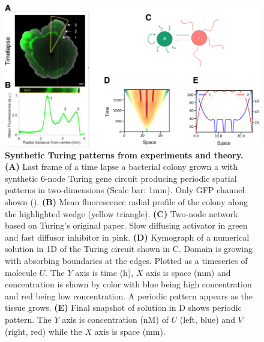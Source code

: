 \begin{figure}[H]
    \includegraphics[width=1\textwidth]{figures/biological_example}

    \caption{{\bf Synthetic Turing patterns from experiments and theory.}
        \textbf{(A)} Last frame of a time lapse a bacterial colony grown a with synthetic 6-node Turing gene circuit producing periodic spatial patterns in two-dimensions (Scale bar: 1mm). Only GFP channel shown (\cite{Oliver2023}). \textbf{(B)} Mean fluorescence radial profile of the colony along the highlighted wedge (yellow triangle). \textbf{(C)} Two-node network based on Turing’s original paper. Slow diffusing activator in green and fast diffusor inhibitor in pink. \textbf{(D)} Kymograph of a numerical solution in 1D of the Turing circuit shown in C. Domain is growing with absorbing boundaries at the edges. Plotted as a timeseries of molecule $U$. The $Y$ axis is time (h), $X$ axis is space (mm) and concentration is shown by color with blue being high concentration and red being low concentration. A periodic pattern appears as the tissue grows. \textbf{(E)} Final snapshot of solution in D shows periodic pattern. The $Y$ axis is concentration (nM) of $U$ (left, blue) and $V$ (right, red) while the $X$ axis is space (mm). }
    \label{fig1}
\end{figure}
